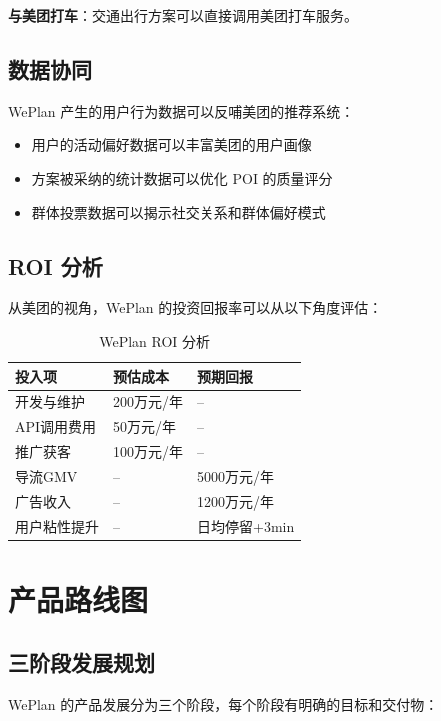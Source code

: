 \documentclass[12pt,a4paper]{ctexart}
\begin{document}
\textbf{与美团打车}：交通出行方案可以直接调用美团打车服务。

\subsection{数据协同}

WePlan 产生的用户行为数据可以反哺美团的推荐系统：

\begin{itemize}[leftmargin=2em]
  \item 用户的活动偏好数据可以丰富美团的用户画像
  \item 方案被采纳的统计数据可以优化 POI 的质量评分
  \item 群体投票数据可以揭示社交关系和群体偏好模式
\end{itemize}

\subsection{ROI 分析}

从美团的视角，WePlan 的投资回报率可以从以下角度评估：

\begin{table}[H]
\centering
\caption{WePlan ROI 分析}
\label{tab:roi-analysis}
\renewcommand{\arraystretch}{1.3}
\begin{tabular}{p{4cm} p{4cm} p{4cm}}
\toprule
\textbf{投入项} & \textbf{预估成本} & \textbf{预期回报} \\
\midrule
开发与维护 & 200万元/年 & -- \\
API调用费用 & 50万元/年 & -- \\
推广获客 & 100万元/年 & -- \\
\midrule
导流GMV & -- & 5000万元/年 \\
广告收入 & -- & 1200万元/年 \\
用户粘性提升 & -- & 日均停留+3min \\
\bottomrule
\end{tabular}
\end{table}

\section{产品路线图}

\subsection{三阶段发展规划}

WePlan 的产品发展分为三个阶段，每个阶段有明确的目标和交付物：
\end{document}
